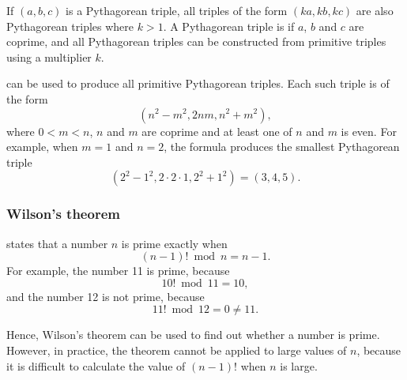 If $(a,b,c)$ is a Pythagorean triple,
all triples of the form $(ka,kb,kc)$
are also Pythagorean triples where $k>1$.
A Pythagorean triple is  if
$a$, $b$ and $c$ are coprime,
and all Pythagorean triples can be constructed
from primitive triples using a multiplier $k$.

 can be used to produce
all primitive Pythagorean triples.
Each such triple is of the form
\[(n^2-m^2,2nm,n^2+m^2),\]
where $0<m<n$, $n$ and $m$ are coprime
and at least one of $n$ and $m$ is even.
For example, when $m=1$ and $n=2$, the formula
produces the smallest Pythagorean triple
\[(2^2-1^2,2\cdot2\cdot1,2^2+1^2)=(3,4,5).\]

\subsubsection{Wilson's theorem}


 states that a number $n$
is prime exactly when
\[(n-1)! \bmod n = n-1.\]
For example, the number 11 is prime, because
\[10! \bmod 11 = 10,\]
and the number 12 is not prime, because
\[11! \bmod 12 = 0 \neq 11.\]

Hence, Wilson's theorem can be used to find out
whether a number is prime. However, in practice, the theorem cannot be
applied to large values of $n$, because it is difficult
to calculate the value of $(n-1)!$ when $n$ is large.


